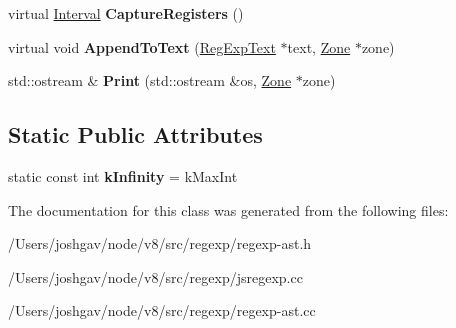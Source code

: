 \begin{DoxyCompactItemize}
\item 
virtual \hyperlink{classv8_1_1internal_1_1_interval}{Interval} {\bfseries Capture\+Registers} ()\hypertarget{classv8_1_1internal_1_1_reg_exp_tree_ac9eaff84346b534c7617bfaf99fe277f}{}\label{classv8_1_1internal_1_1_reg_exp_tree_ac9eaff84346b534c7617bfaf99fe277f}

\item 
virtual void {\bfseries Append\+To\+Text} (\hyperlink{classv8_1_1internal_1_1_reg_exp_text}{Reg\+Exp\+Text} $\ast$text, \hyperlink{classv8_1_1internal_1_1_zone}{Zone} $\ast$zone)\hypertarget{classv8_1_1internal_1_1_reg_exp_tree_a703a7d343de906a8a76dadc11907d6cc}{}\label{classv8_1_1internal_1_1_reg_exp_tree_a703a7d343de906a8a76dadc11907d6cc}

\item 
std\+::ostream \& {\bfseries Print} (std\+::ostream \&os, \hyperlink{classv8_1_1internal_1_1_zone}{Zone} $\ast$zone)\hypertarget{classv8_1_1internal_1_1_reg_exp_tree_af682087bc39041e46f30cc97b6536605}{}\label{classv8_1_1internal_1_1_reg_exp_tree_af682087bc39041e46f30cc97b6536605}

\end{DoxyCompactItemize}
\subsection*{Static Public Attributes}
\begin{DoxyCompactItemize}
\item 
static const int {\bfseries k\+Infinity} = k\+Max\+Int\hypertarget{classv8_1_1internal_1_1_reg_exp_tree_a91c43a4c99efe5ac1ec0db20eff0a1f3}{}\label{classv8_1_1internal_1_1_reg_exp_tree_a91c43a4c99efe5ac1ec0db20eff0a1f3}

\end{DoxyCompactItemize}


The documentation for this class was generated from the following files\+:\begin{DoxyCompactItemize}
\item 
/\+Users/joshgav/node/v8/src/regexp/regexp-\/ast.\+h\item 
/\+Users/joshgav/node/v8/src/regexp/jsregexp.\+cc\item 
/\+Users/joshgav/node/v8/src/regexp/regexp-\/ast.\+cc\end{DoxyCompactItemize}
